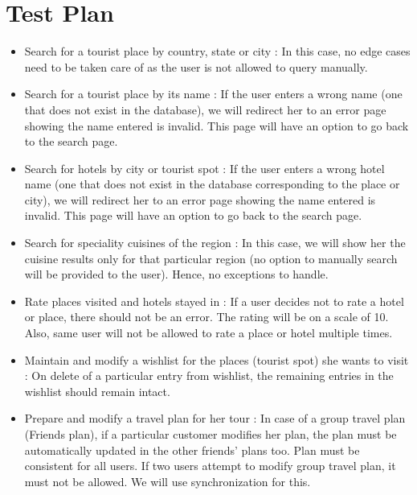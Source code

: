 \documentclass[a4paper,11pt]{article}
\begin{document}
\section{Test Plan}
\begin{itemize}
\item Search for a tourist place by country, state or city :
\newline
In this case, no edge cases need to be taken care of as the user is not allowed to query manually.

\item Search for a tourist place by its name :
\newline
If the user enters a wrong name (one that does not exist in the database),  we will redirect her to an error page showing the name entered is invalid. This page will have an option to go back to the search page.

\item Search for hotels by city or tourist spot :
\newline
If the user enters a wrong hotel name (one that does not exist in the database corresponding to the place or city),  we will redirect her to an error page showing the name entered is invalid. This page will have an option to go back to the search page.

\item Search for speciality cuisines of the region :
\newline
In this case, we will show her the cuisine results only for that particular region (no option to manually search will be provided to the user). Hence, no exceptions to handle.

\item Rate places visited and hotels stayed in :
\newline
If a user decides not to rate a hotel or place, there should not be an error. The rating will be on a scale of 10. Also, same user will not be allowed to rate a place or hotel multiple times. 

\item Maintain and modify a wishlist for the places (tourist spot) she wants to visit :
\newline
On delete of a particular entry from wishlist, the remaining entries in the wishlist should remain intact.

\item Prepare and modify a travel plan for her tour :
\newline
In case of a group travel plan (Friends plan), if a particular customer modifies her plan, the plan must be automatically updated in the other friends' plans too. Plan must be consistent for all users. 
\newline
If two users attempt to modify group travel plan, it must not be allowed. We will use synchronization for this.


\end{itemize}
\end{document}

